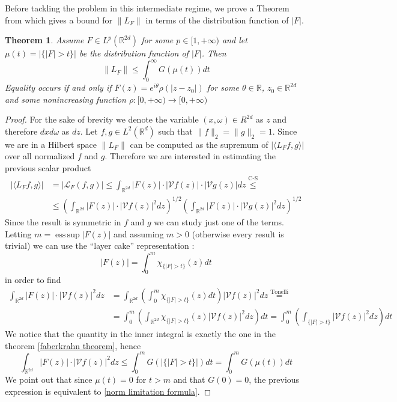 \documentclass[corpo=11pt, stile=classica, tipotesi=custom,
greek, evenboxes, english]{toptesi}
\numberwithin{equation}{chapter}
\newtheorem{teo}{Theorem}[chapter] %
\newcommand{\R}{\mathbb{R}} %
\newcommand{\V}{\mathcal{V}} %
\renewcommand{\L}{\mathscr{L}} %
\DeclareMathOperator*{\esssup}{ess\,sup}
\begin{document}
Before tackling the problem in this intermediate regime, we prove a Theorem from \cite{nicolatilli_norm} which gives a bound for $\| L_F \|$ in terms of the distribution function of $|F|$.
\begin{teo}\label{norm limitation}
	Assume $F \in L^p(\R^{2d})$ for some $p \in [1,+\infty)$ and let $\mu(t) = |\{|F|>t\}|$ be the distribution function of $|F|$. Then
	\begin{equation}\label{norm limitation formula}
		\| L_F \| \leq \int_0^{\infty} G(\mu(t))dt
	\end{equation}
	Equality occurs if and only if $F(z)=e^{i\theta}\rho(|z-z_0|)$ for some $\theta \in \R$, $z_0 \in \R^{2d}$ and some nonincreasing function $\rho : [0,+\infty) \rightarrow [0,+\infty)$
\end{teo}
\begin{proof}
	For the sake of brevity we denote the variable $(x,\omega) \in R^{2d}$ as $z$ and therefore $dxd\omega$ as $dz$. Let $f,g \in L^2(\R^d)$ such that $\| f \|_2 = \| g \|_2 = 1$.
	{\color{blue} Since we are in a Hilbert space $\| L_F \|$ can be computed as the supremum of $|\langle L_F f,g \rangle|$ over all normalized $f$ and $g$. Therefore we are interested in estimating the previous scalar product}
	\begin{equation}\label{first inequality}
	\begin{aligned}
		| \langle L_F f, g \rangle |  &= | \L_{F}(f,g) | \leq \int_{\R^{2d}} |F(z)| \cdot |\V f(z)| \cdot | \V g(z) | dz \overset{\text{C-S}}{\leq} \\
									  &\leq \left( \int_{\R^{2d}} |F(z)| \cdot |\V f(z)|^2 dz \right)^{1/2} \left( \int_{\R^{2d}} |F(z)| \cdot |\V g(z)|^2 dz \right)^{1/2} 
	\end{aligned}
	\end{equation}
	Since the result is symmetric in $f$ and $g$ we can study just one of the terms. Letting $m = \esssup |F(z)|$ and assuming $m>0$ (otherwise every result is trivial) we can use the ``layer cake'' representation \cite[][Theorem 1.13]{liebloss}:
	\begin{equation*}
		|F(z)| = \int_0^m \chi_{\{|F|>t\}}(z)dt 
	\end{equation*}
	in order to find
	\begin{align*}
		\int_{\R^{2d}} |F(z)| \cdot |\V f(z)|^2 dz &= \int_{\R^{2d}} \left( \int_0^m \chi_{\{|F|>t\}}(z)dt \right) |\V f(z)|^2 dz \overset{\text{Tonelli}}{=}\\
											 &= \int_0^m \left( \int_{\R^{2d}} \chi_{\{|F|>t\}}(z) |\V f(z)|^2 dz \right)dt = \int_0^m \left( \int_{\{|F|>t\}} |\V f(z)|^2 dz \right)dt
	\end{align*}
	We notice that the quantity in the inner integral is exactly the one in the theorem \ref{faberkrahn theorem}, hence
	\begin{equation}\label{limitation with G}
		\int_{\R^{2d}} |F(z)| \cdot |\V f(z)|^2 dz \leq \int_0^m G\left(|\{|F|>t\}|\right)dt = \int_0^m G(\mu(t)) dt
	\end{equation}
	We point out that since $\mu(t) = 0$ for $t > m$ and that $G(0)=0$, the previous expression is equivalent to \eqref{norm limitation formula}.
	

\end{proof}
\end{document}
